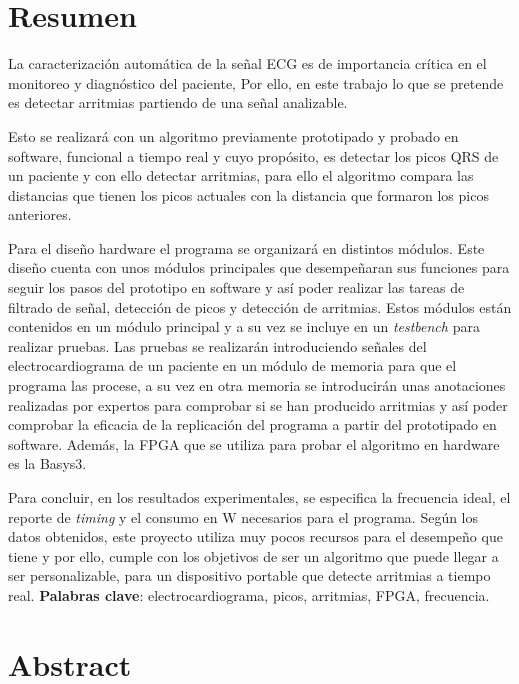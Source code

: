 \chapter*{Resumen}

	La caracterización automática de la señal ECG es de importancia crítica 
	en el monitoreo y diagnóstico del paciente, Por ello, en este trabajo 
	lo que se pretende es detectar arritmias partiendo de una señal analizable. \cite{desai2021low}
    
    Esto se realizará con un algoritmo previamente prototipado y probado en software, funcional a tiempo real y cuyo propósito, es detectar
    los picos QRS de un paciente y con ello detectar arritmias, para ello el algoritmo compara las distancias que tienen los picos actuales con la distancia que formaron los picos anteriores.
    
    Para el diseño hardware el programa se organizará en distintos módulos. Este diseño cuenta con unos módulos principales que desempeñaran sus funciones para 
    seguir los pasos del prototipo en software y así poder realizar las tareas de filtrado de señal, detección de picos y detección de arritmias.
    Estos módulos están contenidos en un módulo principal y a su vez se incluye en un \textit{testbench} para realizar pruebas. Las pruebas se 
    realizarán introduciendo señales del electrocardiograma de un paciente en un módulo de memoria para que el programa las procese, a su vez en otra memoria se introducirán unas anotaciones 
    realizadas por expertos para comprobar si se han producido arritmias y así poder comprobar la eficacia de la replicación del programa a partir del prototipado en software.  Además, la FPGA 
    que se utiliza para probar el algoritmo en hardware es la Basys3.
    
    Para concluir, en los resultados experimentales, se especifica la frecuencia ideal, el reporte de \textit{timing} y el 
    consumo en W necesarios para el programa. Según los datos obtenidos, este proyecto utiliza muy pocos recursos para el desempeño que tiene 
    y por ello, cumple con los objetivos de ser un algoritmo que puede llegar a ser personalizable, para un dispositivo portable que detecte arritmias a tiempo real.
    \textbf{Palabras clave}: electrocardiograma, picos, arritmias, FPGA, frecuencia.

\chapter*{Abstract}

